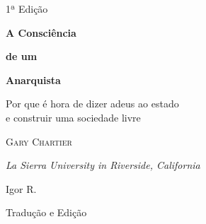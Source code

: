 

\begin{titlepage}
	\center	
	
	\vspace{30pt}
	
	\fontsize{14}{20}\selectfont\textsf{1ª Edição}
	
	\vspace{5pt}
	\fontsize{44}{52}\selectfont\textbf{A Consciência}
	
	\fontsize{26}{32}\selectfont\textbf{de um}
	
	\vspace{-28pt}
	\fontsize{56}{70}\selectfont\textbf{Anarquista}
	
	\vspace{10pt}
	\fontsize{20}{26}\selectfont\textsf{Por que é hora de dizer adeus ao estado\\e construir uma sociedade livre}
	
	
	
	
	\vfill
	
	\LARGE\textsc{Gary Chartier}
	
	\normalsize\emph{La Sierra University in Riverside, California} 
	 
	\vfill 
	        
	\normalsize Igor R.
	
	\small Tradução e Edição
	
	\vfill
	
	\vspace{5pt}
\end{titlepage}

\restoregeometry  